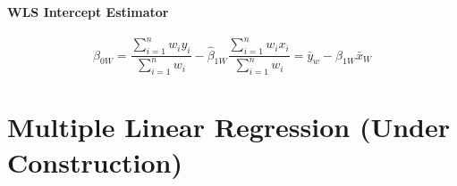 \documentclass[11pt]{article}
\begin{document}
\paragraph{WLS Intercept Estimator}
\begin{equation}
    \hat{\beta}_{0 W}=\frac{\sum_{i=1}^{n} w_{i} y_{i}}{\sum_{i=1}^{n} w_{i}}-\hat{\beta}_{1 W} \frac{\sum_{i=1}^{n} w_{i} x_{i}}{\sum_{i=1}^{n} w_{i}} = \bar{y}_{w}-\hat{\beta}_{1 W} \bar{x}_{W}
\end{equation}

\section{Multiple Linear Regression (Under Construction)}
\end{document}
